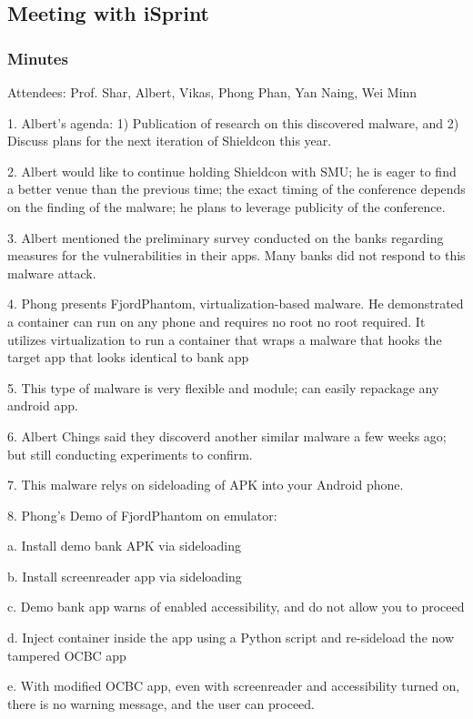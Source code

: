 \subsection{Meeting with iSprint}
\label{task:20240408_android}

\subsubsection{Minutes}

Attendees: Prof. Shar, Albert, Vikas, Phong Phan, Yan Naing, Wei Minn

1. Albert's agenda: 1) Publication of research on this discovered malware, and 2) Discuss plans for the next iteration of Shieldcon this year.

2. Albert would like to continue holding Shieldcon with SMU; he is eager to find a better venue than the previous time; the exact timing of the conference depends on the finding of the malware; he plans to leverage publicity of the conference. 

3. Albert mentioned the preliminary survey conducted on the banks regarding measures for the vulnerabilities in their apps. Many banks did not respond to this malware attack.

4. Phong presents FjordPhantom, virtualization-based malware. He demonstrated a container can run on any phone and requires no root no root required. It utilizes virtualization to run a container that wraps a malware that hooks the target app that looks identical to bank app

5. This type of malware is very flexible and module; can easily repackage any android app.

6. Albert Chings said they discoverd another similar malware a few weeks ago; but still conducting experiments to confirm.

7. This malware relys on sideloading of APK into your Android phone.

8. Phong's Demo of FjordPhantom on emulator:

a. Install demo bank APK via sideloading

b. Install screenreader app via sideloading

c. Demo bank app warns of enabled accessibility, and do not allow you to proceed

d. Inject container inside the app using a Python script and re-sideload the now tampered OCBC app

e. With modified OCBC app, even with screenreader and accessibility turned on, there is no warning message, and the user can proceed.

